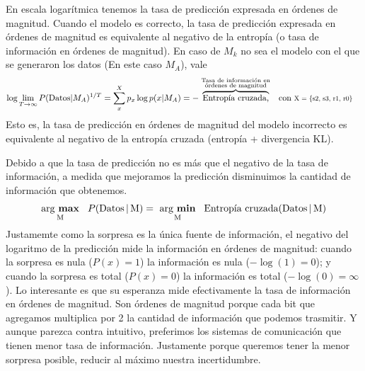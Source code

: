 \documentclass[a4paper,11pt]{book}
\newcommand\hfrac[2]{\genfrac{}{}{0pt}{}{#1}{#2}} %
\theoremstyle{definition}
\begin{document}
%
En escala logar\'itmica tenemos la tasa de predicci\'on expresada en \'ordenes de magnitud.
%
Cuando el modelo es correcto, la tasa de predicci\'on expresada en \'ordenes de magnitud es equivalente al negativo de la entrop\'ia (o tasa de informaci\'on en \'ordenes de magnitud).
%
En caso de $M_k$ no sea el modelo con el que se generaron los datos (En este caso $M_A$), vale
%
\begin{align*}
\log \lim_{T \rightarrow \infty} P(\text{Datos}|M_A)^{1/T} &= \sum_x^X p_x \log p(x|M_A) = - \overbrace{\text{Entrop\'ia cruzada,}}^{\hfrac{\text{\scriptsize Tasa de informaci\'on en}}{\text{\scriptsize \'ordenes de magnitud}}} \hspace{0.25cm}  \text{con } \scalebox{0.8}{X = \{s2, s3, r1, r0\}}
\end{align*}
%
Esto es, la tasa de predicci\'on en \'ordenes de magnitud del modelo incorrecto es equivalente al negativo de la entrop\'ia cruzada (entrop\'ia + divergencia KL).


Debido a que la tasa de predicci\'on no es m\'as que el negativo de la tasa de informaci\'on, a medida que mejoramos la predicci\'on disminuimos la cantidad de informaci\'on que obtenemos.
%
\begin{equation*}
\underset{\text{M}}{\text{arg \textbf{max}}}
\hspace{0.3cm}  P(\text{Datos} \, | \, \text{M}) = \ \underset{\text{M}}{\text{arg \textbf{min}}} \hspace{0.3cm} \text{Entrop\'ia cruzada} (\text{Datos}\,|\,\text{M})
\end{equation*}
%
Justamemte como la sorpresa es la \'unica fuente de informaci\'on, el negativo del logaritmo de la predicci\'on mide la informaci\'on en \'ordenes de magnitud: cuando la sorpresa es nula ($P(x)=1$) la informaci\'on es nula ($-\log(1) = 0$); y cuando la sorpresa es total ($P(x)=0$) la informaci\'on es total ($-\log(0) = \infty$).
%
Lo interesante es que su esperanza mide efectivamente la tasa de informaci\'on en \'ordenes de magnitud.
%
Son \'ordenes de magnitud porque cada bit que agregamos multiplica por 2 la cantidad de informaci\'on que podemos trasmitir.
%
Y aunque parezca contra intuitivo, preferimos los sistemas de comunicaci\'on que tienen menor tasa de informaci\'on.
%
Justamente porque queremos tener la menor sorpresa posible, reducir al m\'aximo nuestra incertidumbre.


\end{document}
